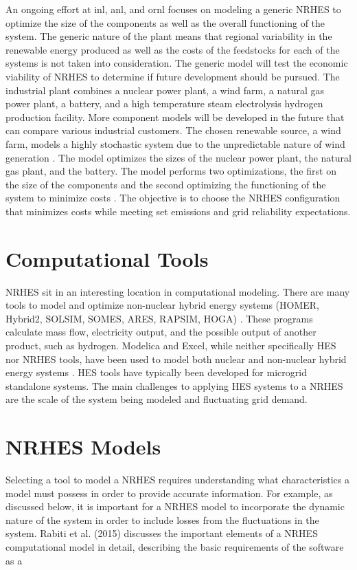 \documentclass[12pt]{UIdahoMastersThesis}
\begin{document}
An ongoing effort at \ac{inl}, \ac{anl}, and \ac{ornl} focuses on modeling a generic NRHES to optimize the size of the components as well as the overall functioning of the system. The generic nature of the plant means that regional variability in the renewable energy produced as well as the costs of the feedstocks for each of the systems is not taken into consideration. The generic model will test the economic viability of NRHES to determine if future development should be pursued. The industrial plant combines a nuclear power plant, a wind farm, a natural gas power plant, a battery, and a high temperature steam electrolysis hydrogen production facility. More component models will be developed in the future that can compare various industrial customers\cite{Harrison2016}. The chosen renewable source, a wind farm, models a highly stochastic system due to the unpredictable nature of wind generation \cite{Chen2016_wind}. The model optimizes the sizes of the nuclear power plant, the natural gas plant, and the battery. The model performs two optimizations, the first on the size of the components and the second optimizing the functioning of the system to minimize costs \cite{redfoot_rabiti_2018}. The objective is to choose the NRHES configuration that minimizes costs while meeting set emissions and grid reliability expectations.

\section{Computational Tools}
NRHES sit in an interesting location in computational modeling. There are many tools to model and optimize non-nuclear hybrid energy systems (HOMER, Hybrid2, SOLSIM, SOMES, ARES, RAPSIM, HOGA) \cite {Bernal-Agustin2009}. These programs calculate mass flow, electricity output, and the possible output of another product, such as hydrogen. Modelica and Excel, while neither specifically HES nor NRHES tools, have been used to model both nuclear and non-nuclear hybrid energy systems \cite{Shropshire2012, Chen2016, Binder2014, Garcia2015, Epiney2016}. HES tools have typically been developed for microgrid standalone systems. The main challenges to applying HES systems to a NRHES are the scale of the system being modeled and fluctuating grid demand. 

\section{NRHES Models}
Selecting a tool to model a NRHES requires understanding what characteristics a model must possess in order to provide accurate information. For example, as discussed below, it is important for a NRHES model to incorporate the dynamic nature of the system in order to include losses from the fluctuations in the system. Rabiti et al. (2015) discusses the important elements of a NRHES computational model in detail, describing the basic requirements of the software as a 
\end{document}
